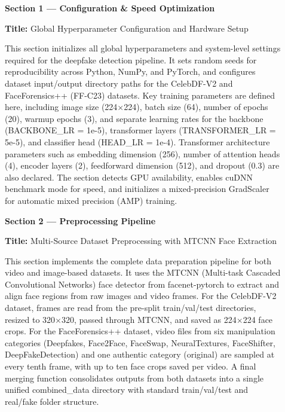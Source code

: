\documentclass[12pt,a4paper]{report}
\begin{document}
\begin{description}

\item[]

\par\noindent\textbf{Section 1 --- Configuration \& Speed Optimization}

\textbf{Title:} Global Hyperparameter Configuration and Hardware Setup

This section initializes all global hyperparameters and system-level settings required for the deepfake detection pipeline. It sets random seeds for reproducibility across Python, NumPy, and PyTorch, and configures dataset input/output directory paths for the CelebDF-V2 and FaceForensics++ (FF-C23) datasets. Key training parameters are defined here, including image size (224$\times$224), batch size (64), number of epochs (20), warmup epochs (3), and separate learning rates for the backbone (BACKBONE\_LR = 1e-5), transformer layers (TRANSFORMER\_LR = 5e-5), and classifier head (HEAD\_LR = 1e-4). Transformer architecture parameters such as embedding dimension (256), number of attention heads (4), encoder layers (2), feedforward dimension (512), and dropout (0.3) are also declared. The section detects GPU availability, enables cuDNN benchmark mode for speed, and initializes a mixed-precision GradScaler for automatic mixed precision (AMP) training.

\vspace{0.5cm}

\textbf{Section 2 --- Preprocessing Pipeline}

\textbf{Title:} Multi-Source Dataset Preprocessing with MTCNN Face Extraction

This section implements the complete data preparation pipeline for both video and image-based datasets. It uses the MTCNN (Multi-task Cascaded Convolutional Networks) face detector from facenet-pytorch to extract and align face regions from raw images and video frames. For the CelebDF-V2 dataset, frames are read from the pre-split train/val/test directories, resized to 320$\times$320, passed through MTCNN, and saved as 224$\times$224 face crops. For the FaceForensics++ dataset, video files from six manipulation categories (Deepfakes, Face2Face, FaceSwap, NeuralTextures, FaceShifter, DeepFakeDetection) and one authentic category (original) are sampled at every tenth frame, with up to ten face crops saved per video. A final merging function consolidates outputs from both datasets into a single unified combined\_data directory with standard train/val/test and real/fake folder structure.


\end{description}
\end{document}
